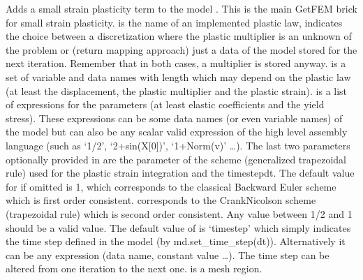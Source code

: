 \documentclass[a4paper,11pt,english]{sphinxmanual}
\begin{document}
\begin{fulllineitems}
\begin{fulllineitems}
Adds a small strain plasticity term to the model . This is the
main GetFEM brick for small strain plasticity.  is the name
of an implemented plastic law,  indicates the choice
between a discretization where the plastic multiplier is an unknown of
the problem or (return mapping approach) just a data of the model
stored for the next iteration. Remember that in both cases, a multiplier
is stored anyway.  is a set of variable and data names with
length which may depend on the plastic law (at least the displacement,
the plastic multiplier and the plastic strain).  is a list of
expressions for the parameters (at least elastic coefficients and the
yield stress). These expressions can be some data names (or even
variable names) of the model but can also be any scalar valid expression
of the high level assembly language (such as ‘1/2’, ‘2+sin(X{[}0{]})’,
‘1+Norm(v)’ …). The last two parameters optionally provided in
 are the  parameter of the \sphinxhyphen{}scheme (generalized
trapezoidal rule) used for the plastic strain integration and the
time\sphinxhyphen{}step\textasciigrave{}dt\textasciigrave{}. The default value for  if omitted is 1, which
corresponds to the classical Backward Euler scheme which is first order
consistent.  corresponds to the Crank\sphinxhyphen{}Nicolson scheme
(trapezoidal rule) which is second order consistent. Any value
between 1/2 and 1 should be a valid value. The default value of  is
‘timestep’ which simply indicates the time step defined in the model
(by md.set\_time\_step(dt)). Alternatively it can be any expression
(data name, constant value …). The time step can be altered from one
iteration to the next one.  is a mesh region.


\end{fulllineitems}
\end{fulllineitems}
\end{document}
